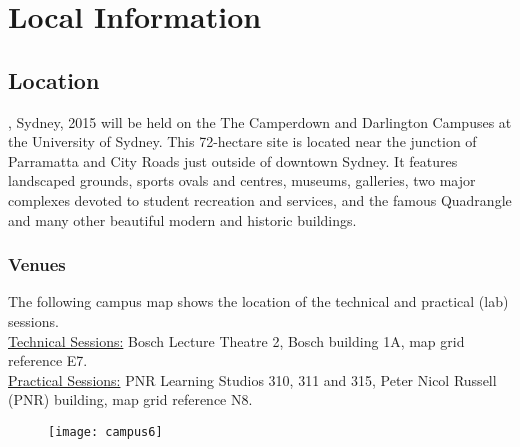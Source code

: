 {}
\section*{Local Information}
%
%
{}
\subsection*{Location}
\mlss, Sydney, 2015 will be held on the The Camperdown and Darlington Campuses at the University of Sydney. 
This 72-hectare site is located near the junction of Parramatta and City Roads just outside of downtown Sydney. It features landscaped grounds, sports ovals and centres, museums, galleries, two major complexes devoted to student recreation and services, and the famous Quadrangle and many other beautiful modern and historic buildings.  
%
\subsubsection*{Venues}
The following campus map shows the location of the  technical  and  practical (lab) sessions. \\ 
%
\underline{Technical Sessions:}
%
Bosch Lecture Theatre 2, Bosch building 1A,  map grid reference E7. \\
%
\underline{Practical Sessions:}
PNR Learning Studios 310, 311 and 315, Peter Nicol Russell (PNR) building, map grid reference N8.
%
\begin{figure}[h!]
\texttt{[image: campus6]}
\end{figure}

\clearpage


{}
